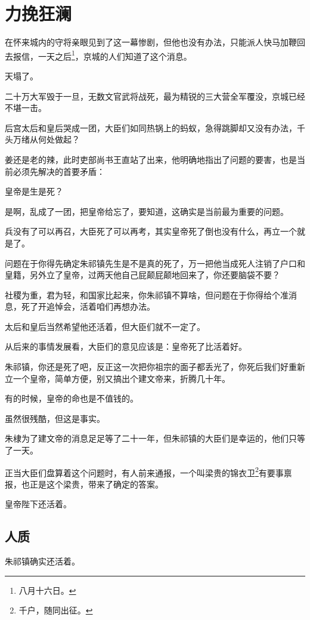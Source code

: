 \section{力挽狂澜}
\ifnum{}
	\begin{multicols}{\theparacolNo}
\fi
在怀来城内的守将亲眼见到了这一幕惨剧，但他也没有办法，只能派人快马加鞭回去报信，一天之后\footnote{八月十六日。}，京城的人们知道了这个消息。

天塌了。

二十万大军毁于一旦，无数文官武将战死，最为精锐的三大营全军覆没，京城已经不堪一击。

后宫太后和皇后哭成一团，大臣们如同热锅上的蚂蚁，急得跳脚却又没有办法，千头万绪从何处做起？

姜还是老的辣，此时吏部尚书王直站了出来，他明确地指出了问题的要害，也是当前必须先解决的首要矛盾：

皇帝是生是死？

是啊，乱成了一团，把皇帝给忘了，要知道，这确实是当前最为重要的问题。

兵没有了可以再召，大臣死了可以再考，其实皇帝死了倒也没有什么，再立一个就是了。

问题在于你得先确定朱祁镇先生是不是真的死了，万一把他当成死人注销了户口和皇籍，另外立了皇帝，过两天他自己屁颠屁颠地回来了，你还要脑袋不要？

社稷为重，君为轻，和国家比起来，你朱祁镇不算啥，但问题在于你得给个准消息，死了开追悼会，活着咱们再想办法。

太后和皇后当然希望他还活着，但大臣们就不一定了。

从后来的事情发展看，大臣们的意见应该是：皇帝死了比活着好。

朱祁镇，你还是死了吧，反正这一次把你祖宗的面子都丢光了，你死后我们好重新立一个皇帝，简单方便，别又搞出个建文帝来，折腾几十年。

有的时候，皇帝的命也是不值钱的。

虽然很残酷，但这是事实。

朱棣为了建文帝的消息足足等了二十一年，但朱祁镇的大臣们是幸运的，他们只等了一天。

正当大臣们盘算着这个问题时，有人前来通报，一个叫梁贵的锦衣卫\footnote{千户，随同出征。}有要事禀报，也正是这个梁贵，带来了确定的答案。

皇帝陛下还活着。

\subsection{人质}
朱祁镇确实还活着。


\end{multicols}
